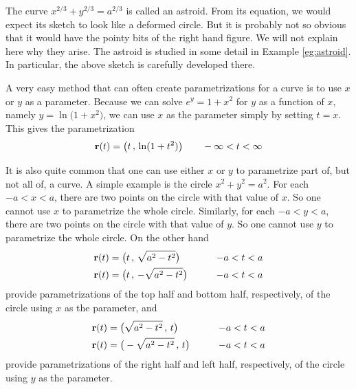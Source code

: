 \begin{eg}[Parametrization of  $\frac{x^2}{a^2}+\frac{y^2}{b^2}=1$ and of
$x^{2/3}+y^{2/3}=a^{2/3}$]
\begin{wfig}
\begin{center}
\end{center}
\end{wfig}
The curve $x^{2/3}+y^{2/3}=a^{2/3}$ is called an astroid. From its equation,
we would expect its sketch to look like a deformed circle. But it is probably 
not so obvious that it would have the pointy bits of the right hand figure.
We will not explain here why they arise. The astroid is studied in some 
detail in Example \ref{eg:astroid}.
In particular, the above sketch is carefully developed there.  
 
\end{eg}

\begin{eg}[Parametrization of  $e^y=1+x^2$]\label{eg:paramMessy}
A very easy method that can often create parametrizations for a curve is to use $x$ or $y$ as a parameter. Because we can solve $e^y=1+x^2$ for $y$ as a function of $x$, namely $y=\ln\big(1+x^2\big)$, we can use $x$ as 
the parameter simply by setting $t=x$. This gives the parametrization
\begin{equation*}
\mathbf{r}(t) = \big(t\,,\,\ln(1+t^2)\big)\qquad -\infty<t<\infty
\end{equation*}  
\end{eg}

\begin{eg}[Parametrization of  $x^2+y^2=a^2$, again]\label{eg:paramCircleC}
It is also quite common that one can use either $x$ or $y$ to parametrize part of, but not all of, a curve. A simple example is the circle $x^2+y^2=a^2$.
For each $-a<x<a$, there are two points on the circle with that value of $x$.
So one cannot use $x$ to parametrize the whole circle.
Similarly, for each $-a<y<a$, there are two points on the circle with that value of $y$. So one cannot use $y$ to parametrize the whole circle. On the other 
hand
\begin{alignat*}{3}
\mathbf{r}(t) &= \big(t\,,\,\sqrt{a^2-t^2}\big)\qquad &-a<t<a \\
\mathbf{r}(t) &= \big(t\,,\,-\sqrt{a^2-t^2}\big)\qquad &-a<t<a
\end{alignat*}
provide parametrizations of the top half and bottom half, respectively,
of the circle using $x$ as the parameter, and
\begin{alignat*}{3}
\mathbf{r}(t) &= \big(\sqrt{a^2-t^2}\,,\,t\big)\qquad &-a<t<a \\
\mathbf{r}(t) &= \big(-\sqrt{a^2-t^2}\,,\,t\big)\qquad &-a<t<a
\end{alignat*}
provide parametrizations of the right half and left half, respectively,
of the circle using $y$ as the parameter.
\end{eg}

